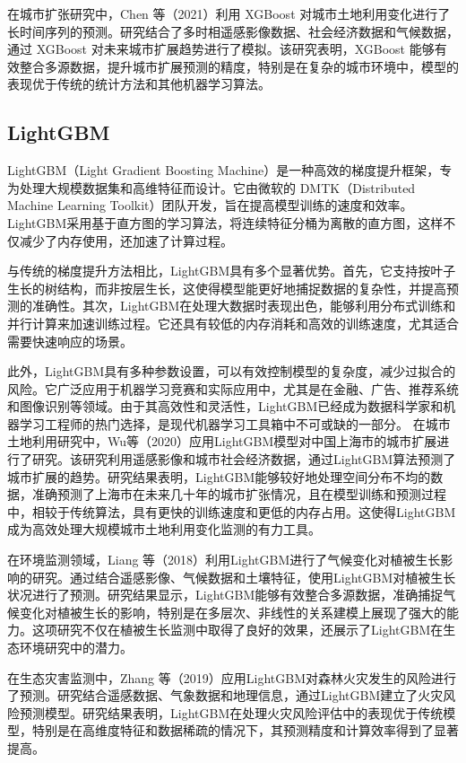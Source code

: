 \documentclass[AutoFakeBold]{LZUThesis-PgD&PhD}
\begin{document}
	在城市扩张研究中，Chen 等（2021）利用 XGBoost 对城市土地利用变化进行了长时间序列的预测\cite{chen2021}。研究结合了多时相遥感影像数据、社会经济数据和气候数据，通过 XGBoost 对未来城市扩展趋势进行了模拟。该研究表明，XGBoost 能够有效整合多源数据，提升城市扩展预测的精度，特别是在复杂的城市环境中，模型的表现优于传统的统计方法和其他机器学习算法。
	
	
	
	\subsection{LightGBM}
	LightGBM（Light Gradient Boosting Machine）是一种高效的梯度提升框架，专为处理大规模数据集和高维特征而设计。它由微软的 DMTK（Distributed Machine Learning Toolkit）团队开发，旨在提高模型训练的速度和效率。LightGBM采用基于直方图的学习算法，将连续特征分桶为离散的直方图，这样不仅减少了内存使用，还加速了计算过程。
	
	与传统的梯度提升方法相比，LightGBM具有多个显著优势。首先，它支持按叶子生长的树结构，而非按层生长，这使得模型能更好地捕捉数据的复杂性，并提高预测的准确性。其次，LightGBM在处理大数据时表现出色，能够利用分布式训练和并行计算来加速训练过程。它还具有较低的内存消耗和高效的训练速度，尤其适合需要快速响应的场景。
	
	此外，LightGBM具有多种参数设置，可以有效控制模型的复杂度，减少过拟合的风险。它广泛应用于机器学习竞赛和实际应用中，尤其是在金融、广告、推荐系统和图像识别等领域。由于其高效性和灵活性，LightGBM已经成为数据科学家和机器学习工程师的热门选择，是现代机器学习工具箱中不可或缺的一部分。
	在城市土地利用研究中，Wu等（2020）应用LightGBM模型对中国上海市的城市扩展进行了研究\cite{wu2020}。该研究利用遥感影像和城市社会经济数据，通过LightGBM算法预测了城市扩展的趋势。研究结果表明，LightGBM能够较好地处理空间分布不均的数据，准确预测了上海市在未来几十年的城市扩张情况，且在模型训练和预测过程中，相较于传统算法，具有更快的训练速度和更低的内存占用。这使得LightGBM成为高效处理大规模城市土地利用变化监测的有力工具。
	
	在环境监测领域，Liang 等（2018）利用LightGBM进行了气候变化对植被生长影响的研究\cite{liang2018}。通过结合遥感影像、气候数据和土壤特征，使用LightGBM对植被生长状况进行了预测。研究结果显示，LightGBM能够有效整合多源数据，准确捕捉气候变化对植被生长的影响，特别是在多层次、非线性的关系建模上展现了强大的能力。这项研究不仅在植被生长监测中取得了良好的效果，还展示了LightGBM在生态环境研究中的潜力。
	
	在生态灾害监测中，Zhang 等（2019）应用LightGBM对森林火灾发生的风险进行了预测\cite{zhang2019}。研究结合遥感数据、气象数据和地理信息，通过LightGBM建立了火灾风险预测模型。研究结果表明，LightGBM在处理火灾风险评估中的表现优于传统模型，特别是在高维度特征和数据稀疏的情况下，其预测精度和计算效率得到了显著提高。
	
\end{document}

